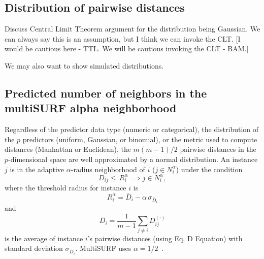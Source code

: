 \documentclass[10pt,letterpaper]{article}\usepackage[]{graphicx}\usepackage[]{color}
\begin{document}
\subsection{Distribution of pairwise distances}
Discuss Central Limit Theorem argument for the distribution being Gaussian. We can always say this is an assumption, but I think we can invoke the CLT. [I would be cautious here - TTL. We will be cautious invoking the CLT - BAM.]

We may also want to show simulated distributions. 

\subsection{Predicted number of neighbors in the multiSURF alpha neighborhood}

Regardless of the predictor data type (numeric or categorical), the distribution of the $p$ predictors (uniform, Gaussian, or binomial), or the metric used to compute distances (Manhattan or Euclidean), the $m(m-1)/2$ pairwise distances in the $p$-dimensional space are well approximated by a normal distribution. An instance $j$ is in the adaptive $\alpha$-radius neighborhood of $i$ ($j \in N^{\alpha}_{i}$) under the condition
%
%
\begin{equation}
D_{ij} \le \, R_i^{\alpha} \implies j \in N^{\alpha}_{i},
\end{equation}
where the threshold radius for instance $i$ is
\begin{equation}
R_i^{\alpha} =  \bar{D}_i - \alpha \, \sigma_{\bar{D}_i}
\end{equation}
and
\begin{equation}
\bar{D}_i = \frac{1}{m-1} \sum_{j \ne i} D^{(\cdot)}_{ij}
\end{equation}
is the average of instance $i$'s pairwise distances (using Eq. D Equation) with standard deviation $\sigma_{\bar{D}_i}$. MultiSURF uses $\alpha=1/2$~\cite{msurf13}.
\end{document}
